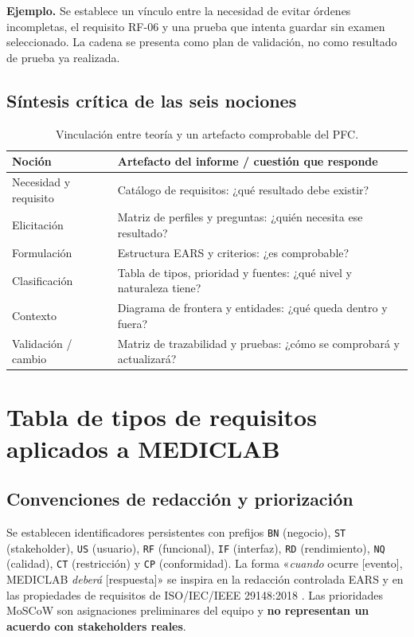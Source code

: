 \textbf{Ejemplo.} Se establece un vínculo entre la necesidad de evitar órdenes incompletas, el requisito RF-06 y una prueba que intenta guardar sin examen seleccionado. La cadena se presenta como plan de validación, no como resultado de prueba ya realizada.

\subsection{Síntesis crítica de las seis nociones}
\begin{table}[H]\centering\small
\caption{Vinculación entre teoría y un artefacto comprobable del PFC.}
\begin{tabularx}{\linewidth}{@{}p{4.1cm}X@{}}\toprule
\textbf{Noción} & \textbf{Artefacto del informe / cuestión que responde}\\\midrule
Necesidad y requisito & Catálogo de requisitos: ¿qué resultado debe existir?\\
Elicitación & Matriz de perfiles y preguntas: ¿quién necesita ese resultado?\\
Formulación & Estructura EARS y criterios: ¿es comprobable?\\
Clasificación & Tabla de tipos, prioridad y fuentes: ¿qué nivel y naturaleza tiene?\\
Contexto & Diagrama de frontera y entidades: ¿qué queda dentro y fuera?\\
Validación / cambio & Matriz de trazabilidad y pruebas: ¿cómo se comprobará y actualizará?\\\bottomrule
\end{tabularx}
\end{table}



\section{Tabla de tipos de requisitos aplicados a MEDICLAB}
\subsection{Convenciones de redacción y priorización}
Se establecen identificadores persistentes con prefijos \texttt{BN} (negocio), \texttt{ST} (stakeholder), \texttt{US} (usuario), \texttt{RF} (funcional), \texttt{IF} (interfaz), \texttt{RD} (rendimiento), \texttt{NQ} (calidad), \texttt{CT} (restricción) y \texttt{CP} (conformidad). La forma «\emph{cuando} ocurre [evento], MEDICLAB \emph{deberá} [respuesta]» se inspira en la redacción controlada EARS \cite{mavin2009} y en las propiedades de requisitos de ISO/IEC/IEEE 29148:2018 \cite{iso29148}. Las prioridades MoSCoW son asignaciones preliminares del equipo y \textbf{no representan un acuerdo con stakeholders reales}.

